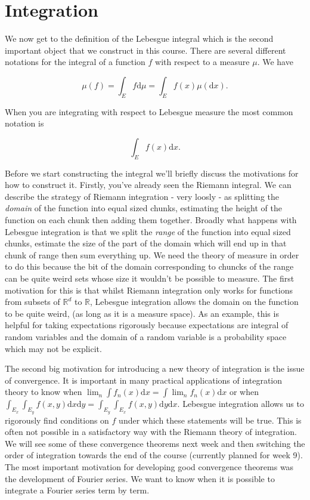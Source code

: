 \documentclass[
]{book}
\theoremstyle{definition}
\theoremstyle{definition}
\theoremstyle{definition}
\theoremstyle{definition}
\theoremstyle{remark}
\begin{document}
\hypertarget{integration-1}{%
\chapter{Integration}\label{integration-1}}

We now get to the definition of the Lebesgue integral which is the second important object that we construct in this course. There are several different notations for the integral of a function \(f\) with respect to a measure \(\mu\). We have

\[ \mu(f) = \int_E f \mathrm{d}\mu = \int_E f(x) \mu(\mathrm{d}x). \]

When you are integrating with respect to Lebesgue measure the most common notation is

\[ \int_E f(x)\mathrm{d}x. \]

Before we start constructing the integral we'll briefly discuss the motivations for how to construct it. Firstly, you've already seen the Riemann integral. We can describe the strategy of Riemann integration - very loosly - as splitting the \emph{domain} of the function into equal sized chunks, estimating the height of the function on each chunk then adding them together. Broadly what happens with Lebesgue integration is that we split the \emph{range} of the function into equal sized chunks, estimate the size of the part of the domain which will end up in that chunk of range then sum everything up. We need the theory of measure in order to do this because the bit of the domain corresponding to chuncks of the range can be quite weird sets whose size it wouldn't be possible to measure. The first motivation for this is that whilst Riemann integration only works for functions from subsets of \(\mathbb{R}^d\) to \(\mathbb{R}\), Lebesgue integration allows the domain on the function to be quite weird, (as long as it is a measure space). As an example, this is helpful for taking expectations rigorously because expectations are integral of random variables and the domain of a random variable is a probability space which may not be explicit.

The second big motivation for introducing a new theory of integration is the issue of convergence. It is important in many practical applications of integration theory to know when \(\lim_n \int f_n(x) \mathrm{d}x = \int \lim_n f_n(x) \mathrm{d}x\) or when \(\int_{E_x} \int_{E_y} f(x,y) \mathrm{d}x \mathrm{d}y = \int_{E_y} \int_{E_x} f(x,y) \mathrm{d}y \mathrm{d}x\). Lebesgue integration allows us to rigorously find conditions on \(f\) under which these statements will be true. This is often not possible in a satisfactory way with the Riemann theory of integration. We will see some of these convergence theorems next week and then switching the order of integration towards the end of the course (currently planned for week 9). The most important motivation for developing good convergence theorems was the development of Fourier series. We want to know when it is possible to integrate a Fourier series term by term.
\end{document}
